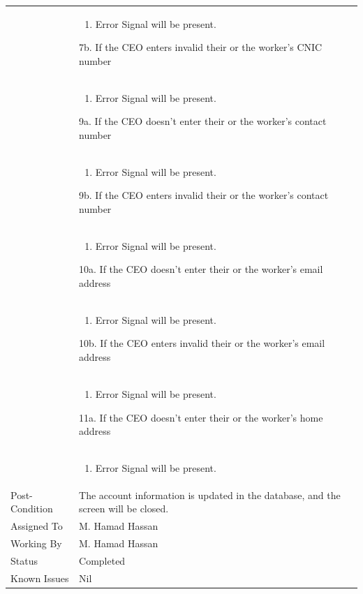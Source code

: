 \documentclass[12pt,a4paper]{article}
\begin{document}
\begin{longtable}{| p{3cm}|p{12cm}|}
&	\begin{enumerate}
		\item Error Signal will be present.
	\end{enumerate}
7b. If the CEO enters invalid their or the worker's CNIC number\\ 	
&	\begin{enumerate}
		\item Error Signal will be present.
	\end{enumerate}
9a. If the CEO doesn't enter their or the worker's contact number\\ 	
&	\begin{enumerate}
		\item Error Signal will be present.
	\end{enumerate}
9b. If the CEO enters invalid their or the worker's contact number\\ 	
&	\begin{enumerate}
		\item Error Signal will be present.
	\end{enumerate}
10a. If the CEO doesn't enter their or the worker's email address\\ 	
&	\begin{enumerate}
		\item Error Signal will be present.
	\end{enumerate}
10b. If the CEO enters invalid their or the worker's email address\\ 	
&	\begin{enumerate}
		\item Error Signal will be present.
	\end{enumerate}
11a. If the CEO doesn't enter their or the worker's home address\\ 	
&	\begin{enumerate}
		\item Error Signal will be present.
	\end{enumerate}
\\ \hline
Post-Condition &  The account information is updated in the database, and the screen will be closed. \\\hline
Assigned To &  M. Hamad Hassan
\\ \hline
Working By &    M. Hamad Hassan
\\ \hline
Status & 	Completed	
\\ \hline
Known Issues & Nil
\\\hline
\end{longtable}
\end{document}
